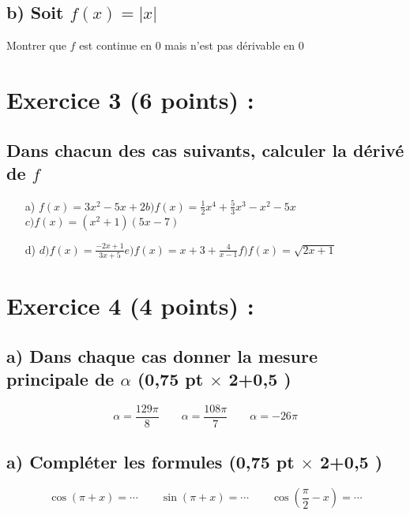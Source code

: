 \documentclass{article}
\begin{document}
\subsection*{b) Soit $f(x)=|x|$ }
Montrer que $f$ est continue en 0 mais n'est pas dérivable en 0 
\section*{Exercice 3 (6 points) :}
\subsection*{ Dans chacun des cas suivants, calculer la dérivé de $f$}
\begin{itemize}
\item[a)]$f(x)=3x^{2}-5x+2$\quad\quad $b)f(x)=\frac{1}{2}x^{4}+\frac{5}{3}x^{3}-x^{2}-5x$\quad\quad $c)f(x)=(x^{2}+1)(5x-7)$
\item[d)]$d)f(x)=\frac{-2x+1}{3x+5}$\quad\quad $e)f(x)=x+3+\frac{4}{x-1}$\quad\quad $f)f(x)=\sqrt{2x+1}$
\end{itemize}
\section*{Exercice 4 (4 points) :}
\subsection*{a) Dans chaque cas donner la mesure principale de $\alpha$ (0,75 pt $\times$ 2+0,5 )}
\[\alpha =\frac{129\pi}{8}\quad\quad \alpha =\frac{108\pi}{7}\quad\quad \alpha = -26\pi \]
\subsection*{a) Compléter les formules (0,75 pt $\times$ 2+0,5 )}
\[\cos(\pi+x)=\cdots\quad\quad \sin(\pi+x)=\cdots\quad\quad \cos(\frac{\pi}{2}-x)=\cdots\]
\end{document}
